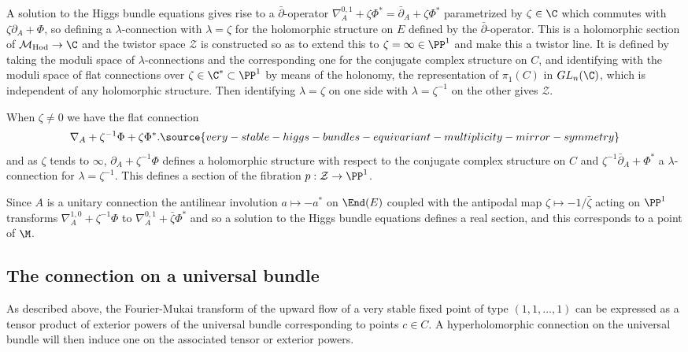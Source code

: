A solution to the Higgs bundle equations gives rise to a $\bar\partial$-operator $\nabla^{0,1}_A+\zeta\Phi^* =\bar\partial_A+\zeta\Phi^*$ parametrized by $\zeta\in \C$ which commutes with $\zeta\partial _A+ \Phi$, so defining a $\lambda$-connection with $\lambda=\zeta$ for the holomorphic structure on $E$ defined by  the $\bar\partial$-operator. This is a holomorphic section of ${\mathcal M}_{\mathrm{Hod}}\rightarrow \C$ and the twistor space ${\mathcal Z}$ is constructed so as to extend this to $\zeta=\infty\in \PP^1$ and make this a twistor line. It  is defined by  taking the moduli space of $\lambda$-connections  and the corresponding one for the conjugate complex structure on $C$, and identifying with the moduli space of  flat connections over $\zeta\in \C^*\subset \PP^1$ by means of the holonomy, the representation of $\pi_1(C)$ in $GL_n(\C)$, which is independent of any holomorphic structure. Then identifying $\lambda=\zeta$ on one side with $\lambda=\zeta^{-1}$ on the other gives ${\mathcal Z}$.



When $\zeta\ne 0$ we have the flat connection
\begin{equation}
\nabla_A+\zeta^{-1}\Phi+\zeta \Phi^*.
\label{flatconn}
\source{very-stable-higgs-bundles-equivariant-multiplicity-mirror-symmetry}
\end{equation}
and as $\zeta$  tends to $\infty$, $\partial_A+\zeta^{-1}\Phi$ defines a holomorphic structure with respect to the conjugate complex structure on $C$ and $\zeta^{-1}\bar\partial_A+\Phi^*$  a $\lambda$-connection for $\lambda=\zeta^{-1}$.   This defines a section of the fibration $p: {\mathcal Z}\rightarrow \PP^1$.

Since $A$ is a unitary connection the antilinear involution $a\mapsto -a^*$ on $\End(E)$ coupled with the antipodal map $\zeta\mapsto -1/\bar \zeta$ acting on $\PP^1$ transforms $\nabla^{1,0} _A+ \zeta^{-1}\Phi$ to  $\nabla^{0,1}_A+\bar \zeta \Phi^*$ and so a solution to the Higgs bundle equations  defines a real section, and this corresponds to a point of $\M$.



\subsection{The connection on a universal bundle}
As described above, the Fourier-Mukai transform of the upward flow of a very stable fixed point  of type $(1,1,\dots,1)$ can be expressed as a tensor product of exterior powers of the universal bundle corresponding to  points $c\in C$. A hyperholomorphic connection on the universal bundle will then induce one on the associated tensor or exterior powers.

